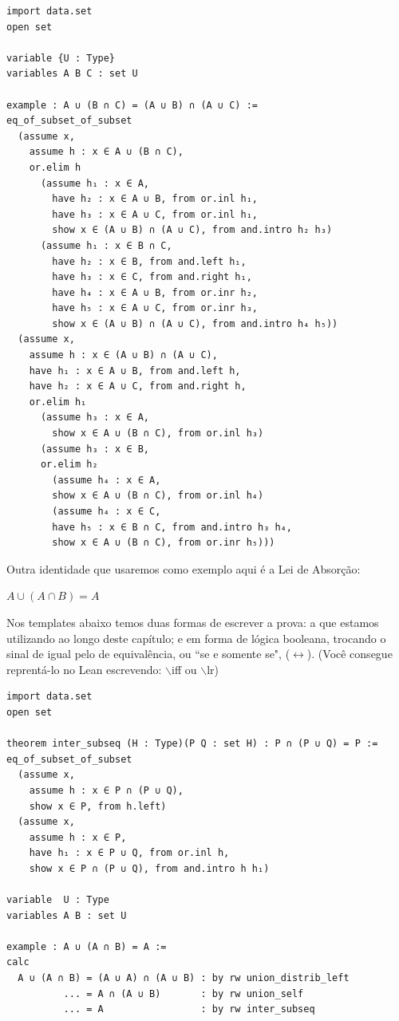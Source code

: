 \begin{lstlisting}
import data.set
open set

variable {U : Type}
variables A B C : set U

example : A ∪ (B ∩ C) = (A ∪ B) ∩ (A ∪ C) :=
eq_of_subset_of_subset
  (assume x,
    assume h : x ∈ A ∪ (B ∩ C),
    or.elim h
      (assume h₁ : x ∈ A,
        have h₂ : x ∈ A ∪ B, from or.inl h₁,
        have h₃ : x ∈ A ∪ C, from or.inl h₁,
        show x ∈ (A ∪ B) ∩ (A ∪ C), from and.intro h₂ h₃)
      (assume h₁ : x ∈ B ∩ C,
        have h₂ : x ∈ B, from and.left h₁,
        have h₃ : x ∈ C, from and.right h₁,
        have h₄ : x ∈ A ∪ B, from or.inr h₂,
        have h₅ : x ∈ A ∪ C, from or.inr h₃,
        show x ∈ (A ∪ B) ∩ (A ∪ C), from and.intro h₄ h₅))
  (assume x,
    assume h : x ∈ (A ∪ B) ∩ (A ∪ C),
    have h₁ : x ∈ A ∪ B, from and.left h,
    have h₂ : x ∈ A ∪ C, from and.right h,
    or.elim h₁
      (assume h₃ : x ∈ A,
        show x ∈ A ∪ (B ∩ C), from or.inl h₃)
      (assume h₃ : x ∈ B,
      or.elim h₂
        (assume h₄ : x ∈ A,
        show x ∈ A ∪ (B ∩ C), from or.inl h₄)
        (assume h₄ : x ∈ C,
        have h₅ : x ∈ B ∩ C, from and.intro h₃ h₄,
        show x ∈ A ∪ (B ∩ C), from or.inr h₅)))
\end{lstlisting}

Outra identidade que usaremos como exemplo aqui é a Lei de Absorção:

\begin{center}
    $A \cup (A \cap B) = A$
\end{center}

Nos templates abaixo temos duas formas de escrever a prova: a que estamos utilizando ao longo deste capítulo; e em forma de lógica booleana, trocando o sinal de igual pelo de equivalência, ou ``se e somente se", ($\leftrightarrow$). (Você consegue reprentá-lo no Lean escrevendo: $\backslash$iff ou $\backslash$lr)

\begin{lstlisting}
import data.set
open set

theorem inter_subseq (H : Type)(P Q : set H) : P ∩ (P ∪ Q) = P :=
eq_of_subset_of_subset
  (assume x,
    assume h : x ∈ P ∩ (P ∪ Q),
    show x ∈ P, from h.left)
  (assume x,
    assume h : x ∈ P,
    have h₁ : x ∈ P ∪ Q, from or.inl h,
    show x ∈ P ∩ (P ∪ Q), from and.intro h h₁)

variable  U : Type
variables A B : set U

example : A ∪ (A ∩ B) = A :=
calc
  A ∪ (A ∩ B) = (A ∪ A) ∩ (A ∪ B) : by rw union_distrib_left
          ... = A ∩ (A ∪ B)       : by rw union_self
          ... = A                 : by rw inter_subseq
\end{lstlisting}

